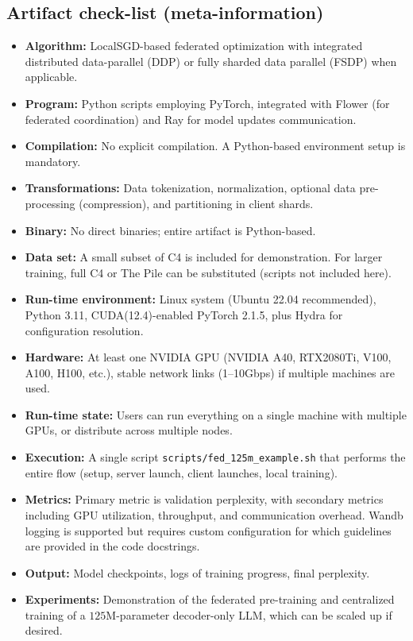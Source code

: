 \documentclass{sigplanconf}
\begin{document}
\subsection{Artifact check-list (meta-information)}
{\small
\begin{itemize}
  \item \textbf{Algorithm:} LocalSGD-based federated optimization with integrated distributed data-parallel (DDP) or fully sharded data parallel (FSDP) when applicable.
  \item \textbf{Program:} Python scripts employing PyTorch, integrated with Flower (for federated coordination) and Ray for model updates communication.
  \item \textbf{Compilation:} No explicit compilation. A Python-based environment setup is mandatory.
  \item \textbf{Transformations:} Data tokenization, normalization, optional data pre-processing (compression), and partitioning in client shards.
  \item \textbf{Binary:} No direct binaries; entire artifact is Python-based.
  \item \textbf{Data set:} A small subset of C4 is included for demonstration. For larger training, full C4 or The Pile can be substituted (scripts not included here).
  \item \textbf{Run-time environment:} Linux system (Ubuntu 22.04 recommended), Python 3.11, CUDA(12.4)-enabled PyTorch 2.1.5, plus Hydra for configuration resolution.
  \item \textbf{Hardware:} At least one NVIDIA GPU (NVIDIA A40, RTX2080Ti, V100, A100, H100, etc.), stable network links (1--10Gbps) if multiple machines are used.
  \item \textbf{Run-time state:} Users can run everything on a single machine with multiple GPUs, or distribute across multiple nodes.
  \item \textbf{Execution:} A single script \texttt{scripts/fed\_125m\_example.sh} that performs the entire flow (setup, server launch, client launches, local training).
  \item \textbf{Metrics:} Primary metric is validation perplexity, with secondary metrics including GPU utilization, throughput, and communication overhead. Wandb logging is supported but requires custom configuration for which guidelines are provided in the code docstrings.
  \item \textbf{Output:} Model checkpoints, logs of training progress, final perplexity.
  \item \textbf{Experiments:} Demonstration of the federated pre-training and centralized training of a $125$M-parameter decoder-only LLM, which can be scaled up if desired.

\end{itemize}}
\end{document}
